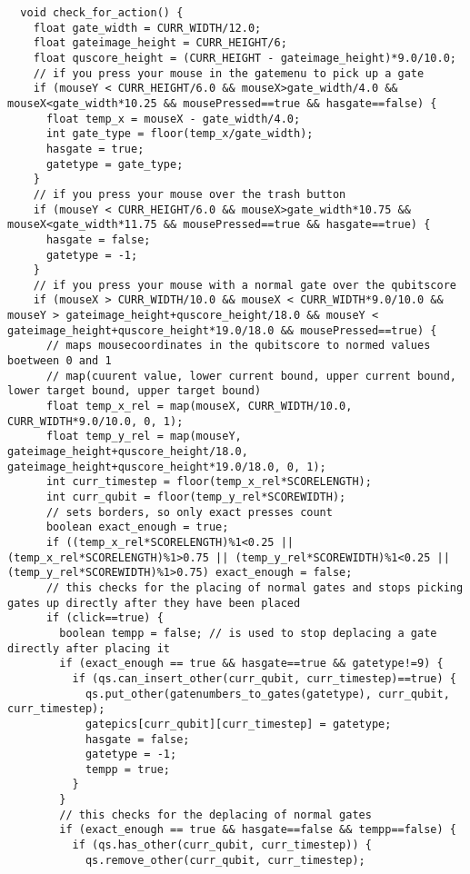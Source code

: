 \documentclass[12pt]{report}
\begin{document}
\begin{lstlisting}
  void check_for_action() {
    float gate_width = CURR_WIDTH/12.0;
    float gateimage_height = CURR_HEIGHT/6;
    float quscore_height = (CURR_HEIGHT - gateimage_height)*9.0/10.0;
    // if you press your mouse in the gatemenu to pick up a gate
    if (mouseY < CURR_HEIGHT/6.0 && mouseX>gate_width/4.0 && mouseX<gate_width*10.25 && mousePressed==true && hasgate==false) {
      float temp_x = mouseX - gate_width/4.0;
      int gate_type = floor(temp_x/gate_width);
      hasgate = true;
      gatetype = gate_type;
    }
    // if you press your mouse over the trash button
    if (mouseY < CURR_HEIGHT/6.0 && mouseX>gate_width*10.75 && mouseX<gate_width*11.75 && mousePressed==true && hasgate==true) {
      hasgate = false;
      gatetype = -1;
    }
    // if you press your mouse with a normal gate over the qubitscore
    if (mouseX > CURR_WIDTH/10.0 && mouseX < CURR_WIDTH*9.0/10.0 && mouseY > gateimage_height+quscore_height/18.0 && mouseY < gateimage_height+quscore_height*19.0/18.0 && mousePressed==true) {
      // maps mousecoordinates in the qubitscore to normed values boetween 0 and 1
      // map(cuurent value, lower current bound, upper current bound, lower target bound, upper target bound)
      float temp_x_rel = map(mouseX, CURR_WIDTH/10.0, CURR_WIDTH*9.0/10.0, 0, 1);
      float temp_y_rel = map(mouseY, gateimage_height+quscore_height/18.0, gateimage_height+quscore_height*19.0/18.0, 0, 1);
      int curr_timestep = floor(temp_x_rel*SCORELENGTH);
      int curr_qubit = floor(temp_y_rel*SCOREWIDTH);
      // sets borders, so only exact presses count
      boolean exact_enough = true;
      if ((temp_x_rel*SCORELENGTH)%1<0.25 || (temp_x_rel*SCORELENGTH)%1>0.75 || (temp_y_rel*SCOREWIDTH)%1<0.25 || (temp_y_rel*SCOREWIDTH)%1>0.75) exact_enough = false;
      // this checks for the placing of normal gates and stops picking gates up directly after they have been placed
      if (click==true) {
        boolean tempp = false; // is used to stop deplacing a gate directly after placing it
        if (exact_enough == true && hasgate==true && gatetype!=9) {
          if (qs.can_insert_other(curr_qubit, curr_timestep)==true) {
            qs.put_other(gatenumbers_to_gates(gatetype), curr_qubit, curr_timestep);
            gatepics[curr_qubit][curr_timestep] = gatetype;
            hasgate = false;
            gatetype = -1;
            tempp = true;
          }
        }
        // this checks for the deplacing of normal gates
        if (exact_enough == true && hasgate==false && tempp==false) {
          if (qs.has_other(curr_qubit, curr_timestep)) {
            qs.remove_other(curr_qubit, curr_timestep);

\end{lstlisting}
\end{document}
